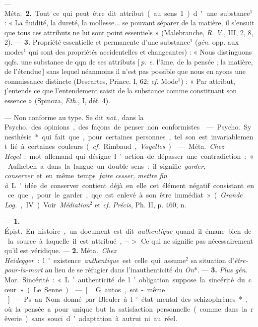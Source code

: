 \begin{itemize}[leftmargin=1cm, label=, itemsep=1pt]
— \si{Méta.} {\bf 2.} Tout ce qui peut être
dit attribut (au sens 1) d'une substance$^1$ : « La fluidité, la dureté, la
mollesse... se pouvant séparer de la
matière, il s'ensuit que tous ces
attributs ne lui sont point essentiels » (Malebranche, {\it R. V.}, III, 2,
8, 2). — {\bf 3.} Propriété essentielle et
permanente d’une substance$^1$ ({\it gén}.
opp. aux modes$^1$ qui sont des propriétés accidentelles et changeantes) :
« Nous distinguons qqfs. une substance de qqn de ses attributs [\,{\it p. e.}
l'âme, de la pensée ; la matière, de
l'étendue\,] sans lequel néanmoins il
n’est pas possible que nous en ayons
une connaissance distincte (Descartes, Prince. I, 62; {\it cf.}  Mode$^1$) :
« Par attribut, j'entends ce que
l’entendement saisit de la substance
comme constituant son essence »
(Spinoza, {\it Eth.}, I, déf. 4).

 — Non conforme au type.
Se dit {\it not.}, dans la \si{Psycho.} des opinions, des façons de penser non
conformistes.

 — \si{Psycho.} Synesthésie* qui fait que, pour certaines
personnes, tel son est invariablement lié à certaines couleurs ({\it cf.} 
Rimbaud, {\it Voyelles}).

 — \si{Méta.} {\it Chez Hegel} : mot
allemand qui désigne l’action de
dépasser une contradiction : « Aufheben a dans la langue un double
sens : il signifie {\it garder, conserver} et
en même temps {\it faire cesser, mettre
fin à}. L'idée de conserver contient
déjà en elle cet élément négatif
consistant en ce que, pour le garder,
qqc est enlevé à son être immédiat »
({\it Grande \si{Log.}}, IV). Voir {\it Médiation}$^2$
et {\it cf.}  {\it Précis}, Ph. II, p. 460, n.

 —  {\bf 1.} \si{Épist.}
En histoire, un document est dit
{\it authentique} quand il émane bien de
la source à laquelle il est attribué,
$->$ Ce qui ne signifie pas nécessairement qu'il est véridique. —  {\bf 2.}
\si{Méta.} {\it Chez Heidegger} : l'existence
{\it authentique} est celle qui assume$^2$
sa situation d'{\it être-pour-la-mort} au
lieu de se réfugier dans l’inauthenticité du {\it On}*. — {\bf 3.} {\it Plus  {\it gén.}} \si{Mor.}
Sincérité : « L’authenticité de l’obligation suppose la sincérité du cœur »
(Le Senne).

 — [\,G. autos, soi-même\,] — Ps.
an. Nom donné par Bleuler à l’état
mental des schizophrènes*, où la
pensée a pour unique but la satisfaction personnelle (comme dans la
rêverie) sans souci d'adaptation à
autrui ni au réel.


\end{itemize}
